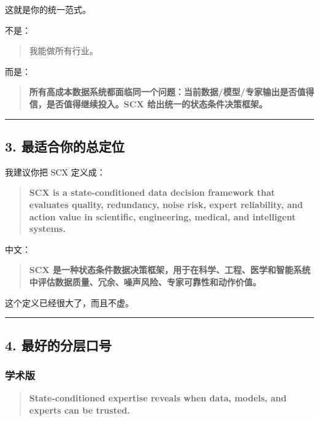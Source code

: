 \documentclass[
  12pt,
]{ctexart}
\begin{document}
这就是你的统一范式。

不是：

\begin{quote}
我能做所有行业。
\end{quote}

而是：

\begin{quote}
\textbf{所有高成本数据系统都面临同一个问题：当前数据/模型/专家输出是否值得信，是否值得继续投入。SCX
给出统一的状态条件决策框架。}
\end{quote}

\begin{center}\rule{0.5\linewidth}{0.5pt}\end{center}

\subsection{3.
最适合你的总定位}\label{ux6700ux9002ux5408ux4f60ux7684ux603bux5b9aux4f4d}

我建议你把 SCX 定义成：

\begin{quote}
\textbf{SCX is a state-conditioned data decision framework that
evaluates quality, redundancy, noise risk, expert reliability, and
action value in scientific, engineering, medical, and intelligent
systems.}
\end{quote}

中文：

\begin{quote}
\textbf{SCX
是一种状态条件数据决策框架，用于在科学、工程、医学和智能系统中评估数据质量、冗余、噪声风险、专家可靠性和动作价值。}
\end{quote}

这个定义已经很大了，而且不虚。

\begin{center}\rule{0.5\linewidth}{0.5pt}\end{center}

\subsection{4.
最好的分层口号}\label{ux6700ux597dux7684ux5206ux5c42ux53e3ux53f7}

\subsubsection{学术版}\label{ux5b66ux672fux7248}

\begin{quote}
\textbf{State-conditioned expertise reveals when data, models, and
experts can be trusted.}
\end{quote}
\end{document}

